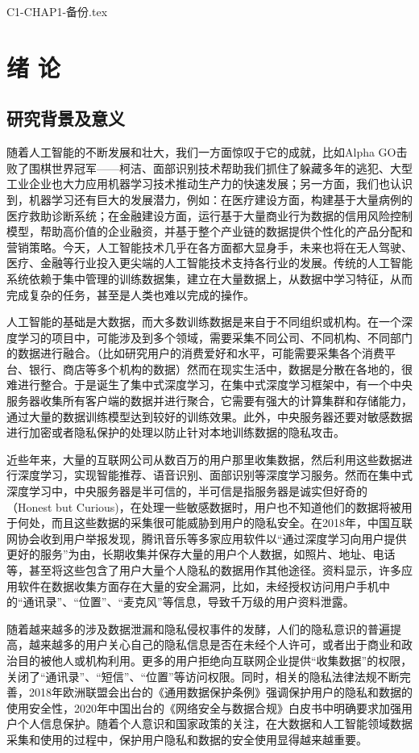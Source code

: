 C1-CHAP1-备份.tex
\chapter{绪\hskip 0.4cm 论}
\label{ch1}

\section{研究背景及意义}
随着人工智能的不断发展和壮大，我们一方面惊叹于它的成就，比如Alpha GO击败了围棋世界冠军——柯洁、面部识别技术帮助我们抓住了躲藏多年的逃犯、大型工业企业也大力应用机器学习技术推动生产力的快速发展；另一方面，我们也认识到，机器学习还有巨大的发展潜力，例如：在医疗建设方面，构建基于大量病例的医疗救助诊断系统；在金融建设方面，运行基于大量商业行为数据的信用风险控制模型，帮助高价值的企业融资，并基于整个产业链的数据提供个性化的产品分配和营销策略。今天，人工智能技术几乎在各方面都大显身手，未来也将在无人驾驶、医疗、金融等行业投入更尖端的人工智能技术支持各行业的发展。传统的人工智能系统依赖于集中管理的训练数据集，建立在大量数据上，从数据中学习特征，从而完成复杂的任务，甚至是人类也难以完成的操作。

人工智能的基础是大数据，而大多数训练数据是来自于不同组织或机构。在一个深度学习的项目中，可能涉及到多个领域，需要采集不同公司、不同机构、不同部门的数据进行融合。（比如研究用户的消费爱好和水平，可能需要采集各个消费平台、银行、商店等多个机构的数据）然而在现实生活中，数据是分散在各地的，很难进行整合。于是诞生了集中式深度学习，在集中式深度学习框架中，有一个中央服务器收集所有客户端的数据并进行聚合，它需要有强大的计算集群和存储能力，通过大量的数据训练模型达到较好的训练效果。此外，中央服务器还要对敏感数据进行加密或者隐私保护的处理以防止针对本地训练数据的隐私攻击。

近些年来，大量的互联网公司从数百万的用户那里收集数据，然后利用这些数据进行深度学习，实现智能推荐、语音识别、面部识别等深度学习服务。然而在集中式深度学习中，中央服务器是半可信的，半可信是指服务器是诚实但好奇的（Honest but Curious)，在处理一些敏感数据时，用户也不知道他们的数据将被用于何处，而且这些数据的采集很可能威胁到用户的隐私安全。在2018年，中国互联网协会收到用户举报发现，腾讯音乐等多家应用软件以“通过深度学习向用户提供更好的服务”为由，长期收集并保存大量的用户个人数据，如照片、地址、电话等，甚至将这些包含了用户大量个人隐私的数据用作其他途径。资料显示，许多应用软件在数据收集方面存在大量的安全漏洞，比如，未经授权访问用户手机中的“通讯录”、“位置”、“麦克风”等信息，导致千万级的用户资料泄露。

随着越来越多的涉及数据泄漏和隐私侵权事件的发酵，人们的隐私意识的普遍提高，越来越多的用户关心自己的隐私信息是否在未经个人许可，或者出于商业和政治目的被他人或机构利用。更多的用户拒绝向互联网企业提供“收集数据”的权限，关闭了“通讯录”、“短信”、“位置”等访问权限。同时，相关的隐私法律法规不断完善，2018年欧洲联盟会出台的《通用数据保护条例》强调保护用户的隐私和数据的使用安全性，2020年中国出台的《网络安全与数据合规》白皮书中明确要求加强用户个人信息保护。随着个人意识和国家政策的关注，在大数据和人工智能领域数据采集和使用的过程中，保护用户隐私和数据的安全使用显得越来越重要。

